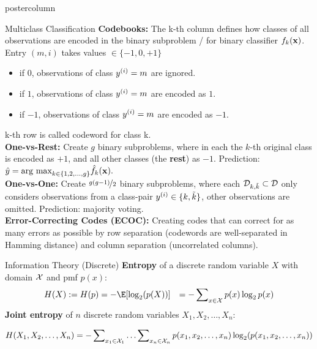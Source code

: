 \documentclass{beamer}
\begin{document}
\begin{frame}[fragile]{}
\begin{columns}
\begin{column}{.31\textwidth}
\begin{beamercolorbox}[center]{postercolumn}
\begin{minipage}{.98\textwidth}
{\begin{myblock}{Multiclass Classification}
								\textbf{Codebooks:}
								The k-th column defines how classes of all observations are encoded in the binary subproblem / for binary classifier $f_k(\mathbf{x})$.
								Entry $(m, i)$ takes values $\in \{-1, 0, +1\}$
								\begin{itemize}
									\setlength{\itemindent}{+.3in}
									\item if $0$, observations of class $y^{(i)} = m$ are ignored.
									\item if $1$, observations of class $y^{(i)} = m$ are encoded as $1$.
									\item if $- 1$, observations of class $y^{(i)} = m$ are encoded as $- 1$.
								\end{itemize} 
								k-th row is called codeword for class k. \\
								\textbf{One-vs-Rest:}
								Create $g$ binary subproblems, where in each the $k$-th original class is encoded as $+1$, and all other classes (the \textbf{rest}) as $- 1$. Prediction:
								$
									\hat y = \text{arg max}_{k \in \{1, 2, ..., g\}} \hat f_k(\mathbf{x}). 
								$\\
								\textbf{One-vs-One:}  Create $\nicefrac{g(g - 1)}{2}$ binary subproblems, where each $\mathcal{D}_{k, \tilde k} \subset \mathcal{D}$ only considers observations from a class-pair $y^{(i)} \in \{k, \tilde k\}$, other observations are omitted.  Prediction: majority voting. \\
								\textbf{Error-Correcting Codes (ECOC):} Creating codes that can correct for as many errors as possible by row separation (codewords are well-separated in Hamming distance) and column separation (uncorrelated columns).
							\end{myblock}

							\begin{myblock}{Information Theory (Discrete)}
								\textbf{Entropy} of a discrete random variable $X$ with domain $\mathcal{X}$ and pmf $p(x)$:
								\begin{equation*}
									\begin{aligned} 
										H(X) := H(p) &= - \E[\log_2(p(X))]           &= -\sum\nolimits_{x \in \Xspace} p(x) \log_2 p(x) 
									\end{aligned} 
								\end{equation*}
								\textbf{Joint entropy} of $n$ discrete random variables $X_1, X_2, \ldots, X_n:$   
								\begin{small}  
									$$ H(X_1, X_2, \ldots, X_n) = - \sum\nolimits_{x_1 \in \mathcal{X}_1} \ldots \sum\nolimits_{x_n \in \mathcal{X}_n} p(x_1,x_2, \ldots, x_n) \log_2(p(x_1,x_2, \ldots, x_n)) $$ 
								\end{small}  


\end{myblock}}
\end{minipage}
\end{beamercolorbox}
\end{column}
\end{columns}
\end{frame}
\end{document}
